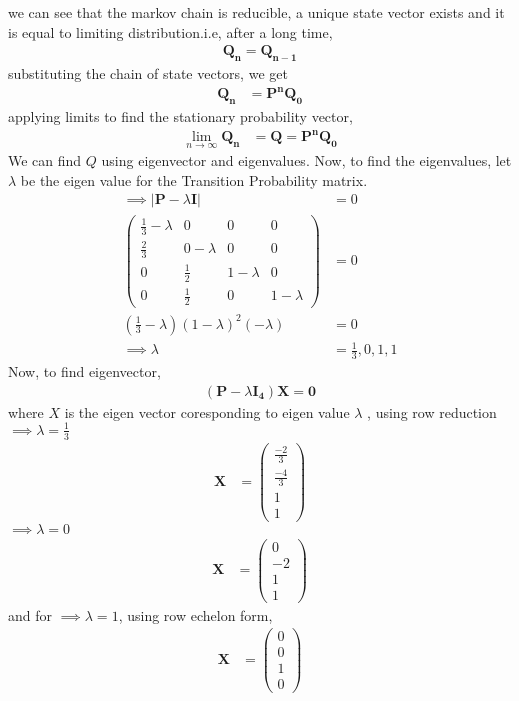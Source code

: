 \documentclass[journal,12pt,two column]{IEEEtran}
\providecommand{\brak}[1]{\ensuremath{\left(#1\right)}}
\newcommand{\myvec}[1]{\ensuremath{\begin{pmatrix}#1\end{pmatrix}}}
\let\vec\mathbf
\begin{document}
we can see that the markov chain is reducible, a unique state vector exists and it is equal to limiting distribution.i.e, after a long time,
\begin{align}
	\vec{Q_n}=\vec{Q_{n-1}}
\end{align}
substituting the chain of state vectors, we get
\begin{align}
    \vec{Q_{n}}&=\vec{P^n Q_0}
\end{align}
applying limits to find the stationary probability vector,
\begin{align}
     \lim_{n \to \infty} \vec{Q_{n}}&=\vec{Q}=\vec{P^n Q_0}
\end{align} \label{eq:steady}
We can find $Q$ using eigenvector and eigenvalues.
Now, to find the eigenvalues, let $\lambda$ be the eigen value for the Transition Probability matrix.
\begin{align}
	\implies |\vec{P} -\lambda \vec{I}|&=0\\
	\myvec{\frac{1}{3} -\lambda&0&0&0\\
                    \frac{2}{3}&0 - \lambda&0&0\\
                    0&\frac{1}{2}&1- \lambda&0\\
                    0&\frac{1}{2}&0&1-\lambda
                }&=0\\
                \brak{\frac{1}{3}-\lambda}\brak{1-\lambda}^2 \brak{-\lambda}&=0\\
                \implies \lambda&=\frac{1}{3},0,1,1
\end{align} 
Now, to find eigenvector,
\begin{align}
	\brak{\vec{P}-\lambda \vec{I_4}}\vec{X}=\vec{0}
\end{align}
where $X$ is the eigen vector coresponding to eigen value $\lambda$ , using row reduction\\
$\implies \lambda =\frac{1}{3}$
\begin{align}
	\vec{X}&=\myvec{\frac{-2}{3}\\\frac{-4}{3}\\1\\1}
\end{align}
$\implies \lambda =0$
\begin{align}
	\vec{X}&=\myvec{0\\-2\\1\\1}
\end{align}
and for $\implies \lambda = 1$, using row echelon form,
\begin{align}
	\vec{X}&=\myvec{0\\0\\1\\0}
\end{align}
\end{document}
